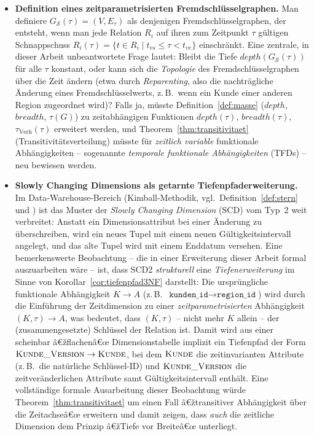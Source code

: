 ﻿\documentclass[a4paper,12pt]{report}
\theoremstyle{definition}
\theoremstyle{remark}
\newcommand{\depth}{\mathit{depth}}
\newcommand{\breadth}{\mathit{breadth}}
\begin{document}
\begin{itemize}
  \item \textbf{Definition eines zeitparametrisierten
    Fremdschlüsselgraphen.} Man definiere
    $G_{\mathcal{S}}(\tau)=(V,E_\tau)$ als denjenigen
    Fremdschlüsselgraphen, der entsteht, wenn man jede Relation $R_i$
    auf ihren zum Zeitpunkt $\tau$ gültigen Schnappschuss
    $R_i(\tau)=\{t\in R_i \mid t_{vs}\leq\tau<t_{ve}\}$ einschränkt.
    Eine zentrale, in dieser Arbeit unbeantwortete Frage lautet: Bleibt
    die Tiefe $\depth(G_{\mathcal{S}}(\tau))$ für alle $\tau$
    konstant, oder kann sich die \emph{Topologie} des
    Fremdschlüsselgraphen über die Zeit ändern (etwa durch
    \emph{Reparenting}, also die nachträgliche Änderung eines
    Fremdschlüsselwerts, z.\,B.\ wenn ein Kunde einer anderen Region
    zugeordnet wird)? Falls ja, müsste Definition~\ref{def:masse}
    ($\depth$, $\breadth$, $\tau(G)$) zu zeitabhängigen Funktionen
    $\depth(\tau)$, $\breadth(\tau)$, $\tau_{\text{Verh}}(\tau)$
    erweitert werden, und Theorem~\ref{thm:transitivitaet}
    (Transitivitätsverteilung) müsste für \emph{zeitlich variable}
    funktionale Abhängigkeiten -- sogenannte \emph{temporale
    funktionale Abhängigkeiten} (TFDs) -- neu bewiesen werden.

  \item \textbf{Slowly Changing Dimensions als getarnte
    Tiefenpfaderweiterung.} Im Data-Warehouse-Bereich
    (Kimball-Methodik, vgl.\ Definition~\ref{def:stern} und
    \cite{Kimball1996}) ist das Muster der \emph{Slowly Changing
    Dimension} (SCD) vom Typ~2 weit verbreitet: Anstatt ein
    Dimensionsattribut bei einer Änderung zu überschreiben, wird ein
    neues Tupel mit einem neuen Gültigkeitsintervall angelegt, und das
    alte Tupel wird mit einem Enddatum versehen. Eine bemerkenswerte
    Beobachtung -- die in einer Erweiterung dieser Arbeit formal
    auszuarbeiten wäre -- ist, dass SCD2 \emph{strukturell} eine
    \emph{Tiefenerweiterung} im Sinne von
    Korollar~\ref{cor:tiefenpfad3NF} darstellt: Die ursprüngliche
    funktionale Abhängigkeit $K\to A$ (z.\,B.\
    $\texttt{kunden\_id}\to\texttt{region\_id}$) wird durch die
    Einführung der Zeitdimension zu einer
    \emph{zeitparametrisierten} Abhängigkeit
    $(K,\tau)\to A$, was bedeutet, dass $(K,\tau)$ -- nicht mehr $K$
    allein -- der (zusammengesetzte) Schlüssel der Relation ist. Damit
    wird aus einer scheinbar â€žflachenâ€œ Dimensionstabelle implizit ein
    Tiefenpfad der Form $\textsc{Kunde\_Version} \to \textsc{Kunde}$,
    bei dem $\textsc{Kunde}$ die zeitinvarianten Attribute (z.\,B.\
    die natürliche Schlüssel-ID) und $\textsc{Kunde\_Version}$ die
    zeitveränderlichen Attribute samt Gültigkeitsintervall enthält.
    Eine vollständige formale Ausarbeitung dieser Beobachtung würde
    Theorem~\ref{thm:transitivitaet} um einen Fall â€žtransitiver
    Abhängigkeit über die Zeitachseâ€œ erweitern und damit zeigen, dass
    \emph{auch} die zeitliche Dimension dem Prinzip â€žTiefe vor Breiteâ€œ
    unterliegt.


\end{itemize}
\end{document}

